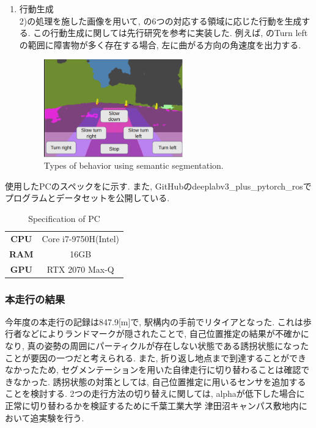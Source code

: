 \documentclass[uplatex, twocolumn, 9pt]{jsproceedings}
\begin{document}
\begin{enumerate}
\begin{figure}[h]
    \label{fig:seg_runarea}%
  \end{figure}
  \item 行動生成\\
  2)の処理を施した画像を用いて, の6つの対応する領域に応じた行動を生成する. この行動生成に関しては先行研究\cite{meiji-thesis}を参考に実装した. 例えば, のTurn leftの範囲に障害物が多く存在する場合, 左に曲がる方向の角速度を出力する. 
  \begin{figure}[h]
    \centering
    \includegraphics[width=60mm]{fig/seg.pdf}
    \caption{Types of behavior using semantic segmentation.}
    \label{fig:seg}%
  \end{figure}
\end{enumerate}
使用したPCのスペックをに示す. また, GitHubのdeeplabv3\_plus\_pytorch\_ros\cite{DeeplabV3}でプログラムとデータセットを公開している.

\begin{table}[h]
  \centering
  \caption{Specification of PC}
  \label{table:pc}
  \begin{tabular}{cc}
  \toprule%
  \textbf{CPU} & Core i7-9750H(Intel)\\
  \textbf{RAM} & 16GB\\
  \textbf{GPU} & RTX 2070 Max-Q\\
  \bottomrule%
  \end{tabular}
\end{table}

\subsubsection{本走行の結果}
今年度の本走行の記録は847.9[m]で, 駅構内の手前でリタイアとなった. これは歩行者などによりランドマークが隠されたことで, 自己位置推定の結果が不確かになり, 真の姿勢の周囲にパーティクルが存在しない状態である誘拐状態\cite{emcl-thesis}になったことが要因の一つだと考えられる. また, 折り返し地点まで到達することができなかったため, セグメンテーションを用いた自律走行に切り替わることは確認できなかった. 誘拐状態の対策としては, 自己位置推定に用いるセンサを追加することを検討する. 2つの走行方法の切り替えに関しては, alphaが低下した場合に正常に切り替わるかを検証するために千葉工業大学 津田沼キャンパス敷地内において追実験を行う. 
\end{document}
